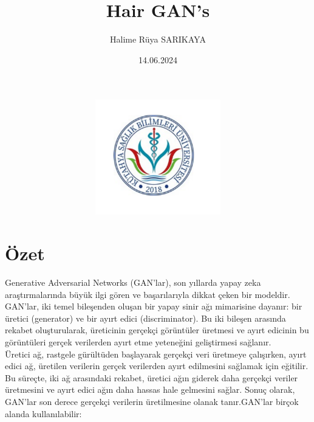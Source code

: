 \documentclass[12pt]{article}
\begin{document}
\begin{figure}
    \centering
    \includegraphics[width=3\textwidth, height=5cm, keepaspectratio]{ksbu.png}
    \label{fig:enter-label}
\end{figure}

\title{Hair GAN's}
\author{Halime Rüya SARIKAYA}
\date{14.06.2024}

\maketitle
\newpage
\tableofcontents
\newpage
\begin{center}
    
\end{center}

\section{Özet}

Generative Adversarial Networks (GAN'lar), son yıllarda yapay zeka araştırmalarında büyük ilgi gören ve başarılarıyla dikkat çeken bir modeldir. GAN'lar, iki temel bileşenden oluşan bir yapay sinir ağı mimarisine dayanır: bir üretici (generator) ve bir ayırt edici (discriminator). Bu iki bileşen arasında rekabet oluşturularak, üreticinin gerçekçi görüntüler üretmesi ve ayırt edicinin bu görüntüleri gerçek verilerden ayırt etme yeteneğini geliştirmesi sağlanır.
\\
Üretici ağ, rastgele gürültüden başlayarak gerçekçi veri üretmeye çalışırken, ayırt edici ağ, üretilen verilerin gerçek verilerden ayırt edilmesini sağlamak için eğitilir. Bu süreçte, iki ağ arasındaki rekabet, üretici ağın giderek daha gerçekçi veriler üretmesini ve ayırt edici ağın daha hassas hale gelmesini sağlar. Sonuç olarak, GAN'lar son derece gerçekçi verilerin üretilmesine olanak tanır.GAN'lar birçok alanda kullanılabilir:
\end{document}
